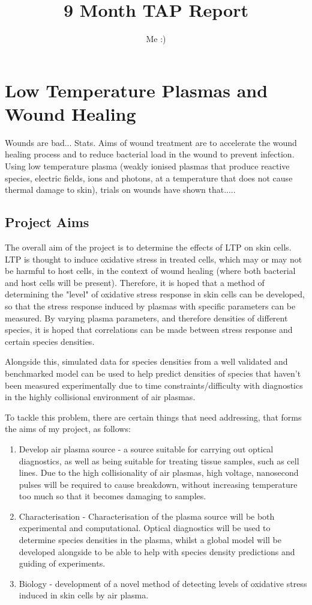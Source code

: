 \documentclass[11pt, oneside]{article}   	%
\title{9 Month TAP Report}
\author{Me :)}
\date{}							%
\begin{document}
\maketitle

\section{Low Temperature Plasmas and Wound Healing}
Wounds are bad... Stats.
Aims of wound treatment are to accelerate the wound healing process and to reduce bacterial load in the wound to prevent infection.
Using low temperature plasma (weakly ionised plasmas that produce reactive species, electric fields, ions and photons, at a temperature that does not cause thermal damage to skin), trials on wounds have shown that.....

\subsection{Project Aims}

The overall aim of the project is to determine the effects of LTP on skin cells.
LTP is thought to induce oxidative stress  in treated cells, which may or may not be harmful to host cells, in the context of wound healing (where both bacterial and host cells will be present). 
Therefore, it is hoped that a method of determining the "level" of oxidative stress response in skin cells can be developed, so that the stress response induced by plasmas with specific parameters can be measured.
By varying plasma parameters, and therefore densities of different species, it is hoped that correlations can be made between stress response and certain species densities.

Alongside this, simulated data for species densities from a well validated and benchmarked model can be used to help predict densities of species that haven't been measured experimentally due to time constraints/difficulty with diagnostics in the highly collisional environment of air plasmas.

To tackle this problem, there are certain things that need addressing, that forms the aims of my project, as follows:
\begin{enumerate}
\item Develop air plasma source - a source suitable for carrying out optical diagnostics, as well as being suitable for treating tissue samples, such as cell lines.
Due to the high collisionality of air plasmas, high voltage, nanosecond pulses will be required to cause breakdown, without increasing temperature too much so that it becomes damaging to samples. 
\item Characterisation - Characterisation of the plasma source will be both experimental and computational. Optical diagnostics will be used to determine species densities in the plasma, whilst a global model will be developed alongside to be able to help with species density predictions and guiding of experiments.
\item Biology - development of a novel method of detecting levels of oxidative stress induced in skin cells by air plasma.
\end{enumerate}
\end{document}
